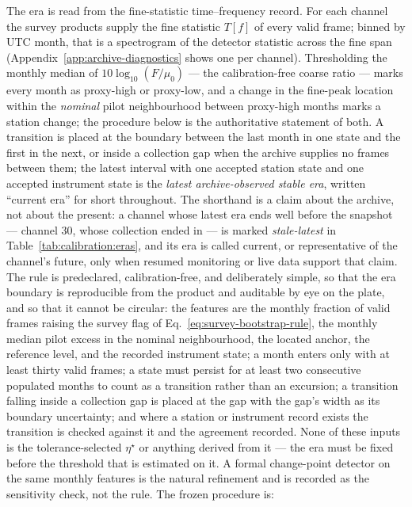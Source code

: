 The era is read from the fine-statistic time--frequency record.  For each
channel the survey products supply the fine statistic $T[f]$ of every valid
frame; binned by UTC month, that is a spectrogram of the detector statistic
across the fine span (Appendix~\ref{app:archive-diagnostics} shows one per
channel).  Thresholding the monthly median of $10\log_{10}(F/\mu_0)$ --- the
calibration-free coarse ratio --- marks every month as proxy-high or
proxy-low, and a change in the fine-peak location within the \emph{nominal}
pilot neighbourhood between proxy-high months marks a station change; the
procedure below is the authoritative statement of both.  A transition is placed at the boundary
between the last month in one state and the first in the next, or inside a
collection gap when the archive supplies no frames between them; the latest
interval with one accepted station state and one accepted instrument state is
the \emph{latest archive-observed stable era}, written ``current era'' for
short throughout.  The shorthand is a claim about the archive, not about the
present: a channel whose latest era ends well before the snapshot --- channel
30, whose collection ended in  --- is marked
\emph{stale-latest} in Table~\ref{tab:calibration:eras}, and its era is called
current, or representative of the channel's future, only when resumed
monitoring or live data support that claim.  The rule is predeclared, calibration-free, and deliberately simple, so
that the era boundary is reproducible from the product and auditable by eye on
the plate, and so that it cannot be circular: the features are the monthly
fraction of valid frames raising the survey flag of
Eq.~\eqref{eq:survey-bootstrap-rule}, the monthly median pilot excess in the
nominal neighbourhood, the located anchor, the reference level, and the
recorded instrument state; a month enters only with at least thirty valid
frames; a state must persist for at least two consecutive populated months to
count as a transition rather than an excursion; a transition falling inside a
collection gap is placed at the gap with the gap's width as its boundary
uncertainty; and where a station or instrument record exists the transition is
checked against it and the agreement recorded.  None of these inputs is the
tolerance-selected $\eta^\star$ or anything derived from it --- the era must be
fixed before the threshold that is estimated on it.  A formal change-point
detector on the same monthly features \cite{killick2012} is the natural
refinement and is recorded as the sensitivity check, not the rule.  The frozen
procedure is:


